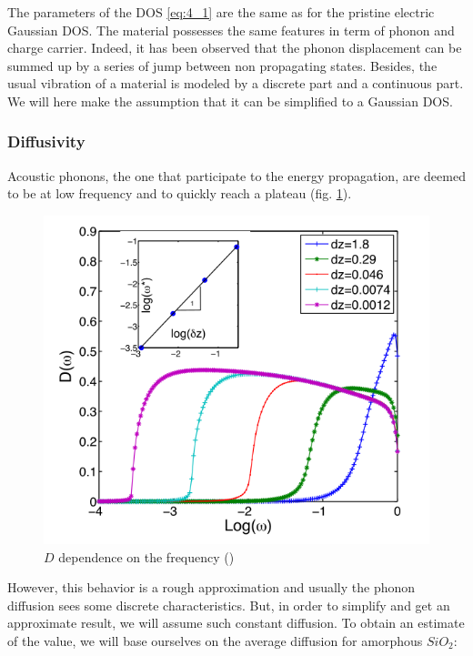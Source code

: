 The parameters of the DOS \ref{eq:4_1} are the same as for the pristine electric Gaussian DOS. The material possesses the same features in term of phonon and charge carrier. Indeed, it has been observed \cite{phonon_hopping} that the phonon displacement can be summed up by a series of jump between non propagating states. Besides, the usual vibration of a material is modeled by a discrete part \cite{vibration_phonon} and a continuous part. We will here make the assumption that it can be simplified to a Gaussian DOS.

\subsubsection{Diffusivity}

Acoustic phonons, the one that participate to the energy propagation, are deemed to be at low frequency and to quickly reach a plateau (fig. \ref{fig:4_1}).

\begin{figure}[!h]
    \centering
    \includegraphics*[width=.5\paperwidth]{figures/4_thermal/plateau.png}
    \caption{$D$ dependence on the frequency (\cite{phonon_plateau}) \label{fig:4_1}}
\end{figure}

However, this behavior is a rough approximation and usually the phonon diffusion sees some discrete characteristics. But, in order to simplify and get an approximate result, we will assume such constant diffusion. To obtain an estimate of the value, we will base ourselves on the average diffusion for amorphous $SiO_2$:


